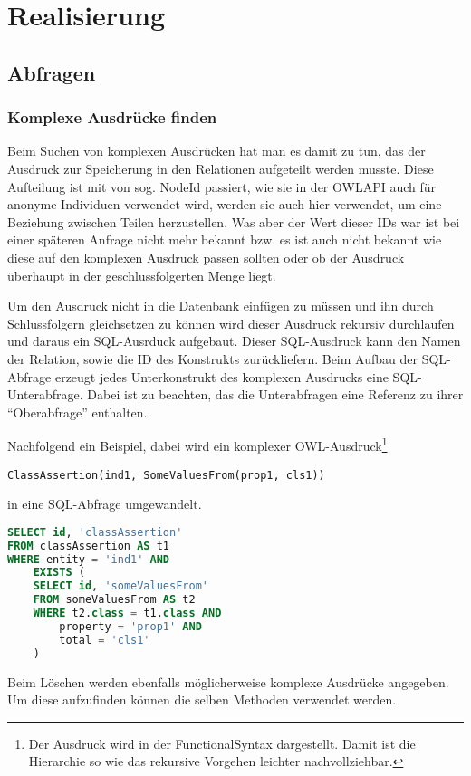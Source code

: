 \chapter{Realisierung}



\section{Abfragen}
\subsection{Komplexe Ausdrücke finden}
Beim Suchen von komplexen Ausdrücken hat man es damit zu tun, das der Ausdruck zur Speicherung in den Relationen aufgeteilt werden musste. Diese Aufteilung ist mit von sog. NodeId passiert, wie sie in der OWLAPI auch für anonyme Individuen verwendet wird, werden sie auch hier verwendet, um eine Beziehung zwischen Teilen herzustellen. Was aber der Wert dieser IDs war ist bei einer späteren Anfrage nicht mehr bekannt bzw. es ist auch nicht bekannt wie diese auf den komplexen Ausdruck passen sollten oder ob der Ausdruck überhaupt in der geschlussfolgerten Menge liegt.

Um den Ausdruck nicht in die Datenbank einfügen zu müssen und ihn durch Schlussfolgern gleichsetzen zu können wird dieser Ausdruck rekursiv durchlaufen und daraus ein SQL-Ausrduck aufgebaut. Dieser SQL-Ausdruck kann den Namen der Relation, sowie die ID des Konstrukts zurückliefern. Beim Aufbau der SQL-Abfrage erzeugt jedes Unterkonstrukt des komplexen Ausdrucks eine SQL-Unterabfrage. Dabei ist zu beachten, das die Unterabfragen eine Referenz zu ihrer ``Oberabfrage'' enthalten.

Nachfolgend ein Beispiel, dabei wird ein komplexer OWL-Ausdruck\footnote{Der Ausdruck wird in der FunctionalSyntax dargestellt. Damit ist die Hierarchie so wie das rekursive Vorgehen leichter nachvollziehbar.}

\begin{verbatim}
ClassAssertion(ind1, SomeValuesFrom(prop1, cls1))
\end{verbatim}

in eine SQL-Abfrage umgewandelt.

\begin{lstlisting}[language=SQL]
SELECT id, 'classAssertion'
FROM classAssertion AS t1
WHERE entity = 'ind1' AND
	EXISTS (
	SELECT id, 'someValuesFrom'
	FROM someValuesFrom AS t2
	WHERE t2.class = t1.class AND
		property = 'prop1' AND
		total = 'cls1'
	)
\end{lstlisting}

Beim Löschen werden ebenfalls möglicherweise komplexe Ausdrücke angegeben. Um diese aufzufinden können die selben Methoden verwendet werden.





